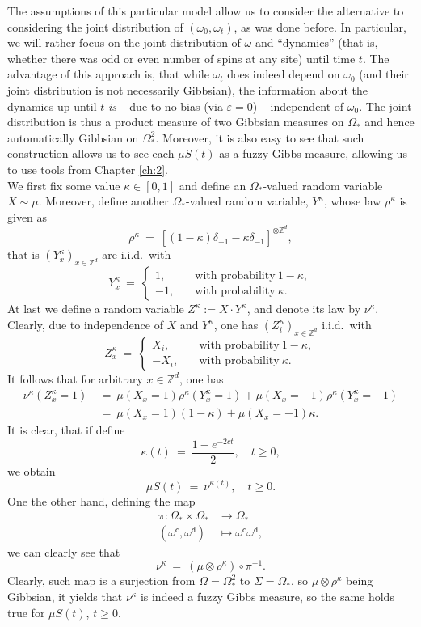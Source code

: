 \documentclass[12pt]{article}
\newcommand{\Z}{\mathbb{Z}}
\newcommand{\oglati}[1]{\left[#1\right]}
\newcommand{\ra}{\rightarrow}
\newcommand{\1}{\mathbbm{1}}
\renewcommand{\c}{\mathsf{c}}
\newcommand{\5}{\vspace{0.5cm}}
\theoremstyle{definition}
\begin{document}
The assumptions of this particular model allow us to consider the alternative to considering the joint distribution of $(\omega_0,\omega_t)$, as was done before. In particular, we will rather focus on the joint distribution of $\omega$ and ``dynamics'' (that is, whether there was odd or even number of spins at any site) until time $t$. The advantage of this approach is, that while $\omega_t$ does indeed depend on $\omega_0$ (and their joint distribution is not necessarily Gibbsian), the information about the dynamics up until $t$ \textit{is} -- due to no bias (via $\varepsilon=0$) -- independent of $\omega_0$. The joint distribution is thus a product measure of two Gibbsian measures on $\Omega_*$ and hence automatically Gibbsian on $\Omega_*^2$. Moreover, it is also easy to see that such construction allows us to see each $\mu S(t)$ as a fuzzy Gibbs measure, allowing us to use tools from Chapter \ref{ch:2}. \\

We first fix some value $\kappa\in[0,1]$ and define an $\Omega_*$-valued random variable $X\sim\mu$. Moreover, define another $\Omega_*$-valued random variable, $Y^\kappa$, whose law $\rho^\kappa$ is given as
$$\rho^\kappa ~=~ \oglati{(1-\kappa)\delta_{+1}-\kappa\delta_{-1}}^{\otimes\Z^d},$$
that is $(Y_x^\kappa)_{x\in\Z^d}$ are i.i.d.~with
$$Y_x^\kappa ~=~ \begin{cases}
1, \quad &\text{with probability}~1-\kappa,\\
-1, \quad &\text{with probability}~\kappa.	
\end{cases}$$
At last we define a random variable $Z^\kappa:=X\cdot Y^\kappa$, and denote its law by $\nu^\kappa$. Clearly, due to independence of $X$ and $Y^\kappa$, one has $(Z_i^\kappa)_{x\in\Z^d}$ i.i.d.~with 
$$Z_x^\kappa ~=~ \begin{cases}
X_i, \quad &\text{with probability}~1-\kappa,\\
-X_i, \quad &\text{with probability}~\kappa.
\end{cases}$$
It follows that for arbitrary $x\in\Z^d$, one has
\begin{align*}
\nu^\kappa(Z_x^\kappa=1) ~&=~ \mu(X_x=1)\rho^\kappa(Y_x^\kappa=1) + \mu(X_x=-1)\rho^\kappa(Y_x^\kappa=-1) \\
&=~ \mu(X_x=1)(1-\kappa)+\mu(X_x=-1)\kappa.
\end{align*}
It is clear, that if define 
$$\kappa(t) ~=~ \frac{1-e^{-2ct}}{2}, \quad t\geq 0,$$
we obtain
$$\mu S(t) ~=~ \nu^{\kappa(t)}, \quad t\geq 0.$$
One the other hand, defining the map
\begin{align*}
\pi:\Omega_*\times\Omega_*&\ra\Omega_* \\
(\omega^\c,\omega^\mathsf{d})&\mapsto\omega^\c\omega^\mathsf{d},
\end{align*}
we can clearly see that
$$\nu^{\kappa} ~=~ (\mu\otimes\rho^\kappa)\circ\pi^{-1}.$$
Clearly, such map is a surjection from $\Omega=\Omega_*^2$ to $\Sigma=\Omega_*$, so $\mu\otimes\rho^\kappa$ being Gibbsian, it yields that $\nu^\kappa$ is indeed a fuzzy Gibbs measure, so the same holds true for $\mu S(t)$, $t\geq 0$. \\
\end{document}
